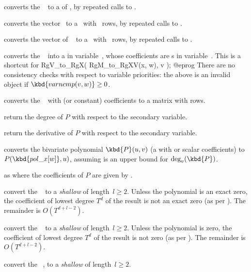  converts the ~
to a  of , by repeated calls to .

 converts the vector~ to
a~ with ~rows, by repeated calls to .

 converts the vector of ~
to a~ with ~rows, by repeated calls to .

 converts the ~ into
a  in variable~, whose coefficients are s in
variable~. This is a shortcut for
\bprog
  RgV_to_RgX( RgM_to_RgXV(x, w), v );
@eprog\noindent
There are no consistency checks with respect to variable
priorities: the above is an invalid object if $\kbd{varncmp(v, w)} \geq 0$.

 converts the ~ with
 (or constant) coefficients to a matrix with  rows.

 return the degree of $P$ with respect to
the secondary variable.

 return the derivative of $P$ with respect to
the secondary variable.

 converts the bivariate polynomial
$\kbd{P}(u,v)$ (a  with  or scalar coefficients) to
$P(\kbd{pol\_x[w]},u)$, assuming  is an upper bound for
$\deg_v(\kbd{P})$.

as  where the coefficients of $P$ are given by
.

 convert the ~ to
a \emph{shallow}  of length~$l\geq 2$.
Unless the polynomial is an exact zero, the coefficient of lowest degree
$T^d$ of the result is not an exact zero (as per ). The
remainder is $O(T^{d+l-2})$.

 convert the ~ to
a \emph{shallow}  of length~$l\geq 2$.
Unless the polynomial is zero, the coefficient of lowest degree
$T^d$ of the result is not zero (as per ). The
remainder is $O(T^{d+l-2})$.

 convert the ~,
to a \emph{shallow}  of length~$l\geq 2$.

